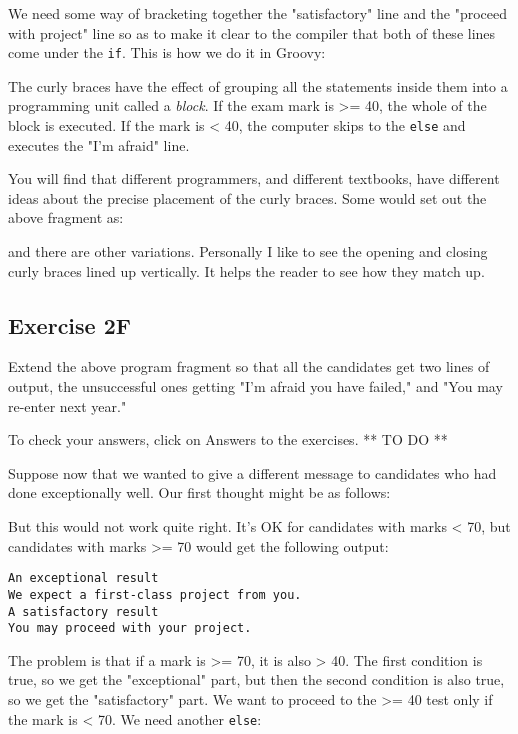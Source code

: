 We need some way of bracketing together
the "satisfactory" line and the "proceed with project" line so as to make
it clear to the compiler that both of these lines come under the  \verb!if!.
This is how we do it in Groovy:


The curly braces have the effect of grouping all the statements inside
them into a programming unit called a \emph{block}.  If the exam mark is
>= 40, the whole of the block is executed.  If the mark is < 40, the
computer skips to the  \verb!else! and executes the "I'm afraid" line.

You will find that different programmers, and different textbooks, have
different ideas about the precise placement of the curly braces.  Some would
set out the above fragment as:


and there are other variations.  Personally I like to see the opening and
closing curly braces lined up vertically.  It helps the reader to see how
they match up.

\subsection*{Exercise 2F}

Extend the above program fragment so that all the candidates
get two lines of output, the unsuccessful ones getting "I'm afraid you
have failed," and "You may re-enter next year."

To check your answers, click on Answers to the exercises. ** TO DO **

Suppose now that we wanted to give a different message to candidates who
had done exceptionally well.  Our first thought might be as follows:


But this would not work quite right.  It's OK for candidates with marks < 70,
but candidates with marks >= 70 would get the following output:
\begin{Verbatim}
An exceptional result
We expect a first-class project from you.
A satisfactory result
You may proceed with your project.
\end{Verbatim}
The problem is that if a mark is >= 70, it is also > 40.  The first
condition is true, so we get the "exceptional" part, but then the second
condition is also true, so we get the "satisfactory" part.  We want to
proceed to the >= 40 test only if the mark is < 70.  We need another  \verb!else!:

